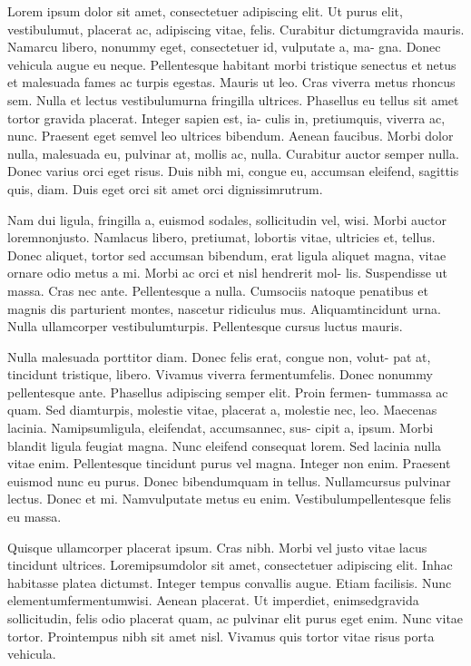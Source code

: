 \documentclass[12pt,a4paper]{article}
\begin{document}

Lorem ipsum dolor sit amet, consectetuer adipiscing elit. Ut purus elit,
vestibulumut, placerat ac, adipiscing vitae, felis. Curabitur dictumgravida
mauris. Namarcu libero, nonummy eget, consectetuer id, vulputate a, ma-
gna. Donec vehicula augue eu neque. Pellentesque habitant morbi tristique
senectus et netus et malesuada fames ac turpis egestas. Mauris ut leo. Cras
viverra metus rhoncus sem. Nulla et lectus vestibulumurna fringilla ultrices.
Phasellus eu tellus sit amet tortor gravida placerat. Integer sapien est, ia-
culis in, pretiumquis, viverra ac, nunc. Praesent eget semvel leo ultrices
bibendum. Aenean faucibus. Morbi dolor nulla, malesuada eu, pulvinar at,
mollis ac, nulla. Curabitur auctor semper nulla. Donec varius orci eget risus.
Duis nibh mi, congue eu, accumsan eleifend, sagittis quis, diam. Duis eget
orci sit amet orci dignissimrutrum.

Nam dui ligula, fringilla a, euismod sodales, sollicitudin vel, wisi. Morbi
auctor loremnonjusto. Namlacus libero, pretiumat, lobortis vitae, ultricies
et, tellus. Donec aliquet, tortor sed accumsan bibendum, erat ligula aliquet
magna, vitae ornare odio metus a mi. Morbi ac orci et nisl hendrerit mol-
lis. Suspendisse ut massa. Cras nec ante. Pellentesque a nulla. Cumsociis
natoque penatibus et magnis dis parturient montes, nascetur ridiculus mus.
Aliquamtincidunt urna. Nulla ullamcorper vestibulumturpis. Pellentesque
cursus luctus mauris.

Nulla malesuada porttitor diam. Donec felis erat, congue non, volut-
pat at, tincidunt tristique, libero. Vivamus viverra fermentumfelis. Donec
nonummy pellentesque ante. Phasellus adipiscing semper elit. Proin fermen-
tummassa ac quam. Sed diamturpis, molestie vitae, placerat a, molestie
nec, leo. Maecenas lacinia. Namipsumligula, eleifendat, accumsannec, sus-
cipit a, ipsum. Morbi blandit ligula feugiat magna. Nunc eleifend consequat
lorem. Sed lacinia nulla vitae enim. Pellentesque tincidunt purus vel magna.
Integer non enim. Praesent euismod nunc eu purus. Donec bibendumquam
in tellus. Nullamcursus pulvinar lectus. Donec et mi. Namvulputate metus
eu enim. Vestibulumpellentesque felis eu massa.

Quisque ullamcorper placerat ipsum. Cras nibh. Morbi vel justo vitae
lacus tincidunt ultrices. Loremipsumdolor sit amet, consectetuer adipiscing
elit. Inhac habitasse platea dictumst. Integer tempus convallis augue. Etiam
facilisis. Nunc elementumfermentumwisi. Aenean placerat. Ut imperdiet,
enimsedgravida sollicitudin, felis odio placerat quam, ac pulvinar elit purus
eget enim. Nunc vitae tortor. Prointempus nibh sit amet nisl. Vivamus quis
tortor vitae risus porta vehicula.
\end{document}
